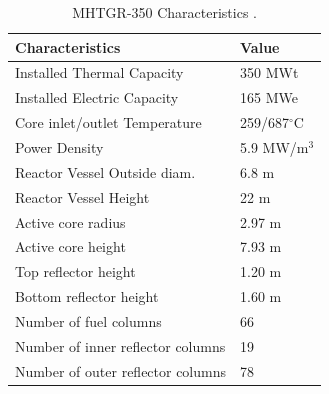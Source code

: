\begin{table}[htbp!]
  \centering
    \caption{MHTGR-350 Characteristics \cite{oecd_nea_benchmark_2017}.}
  \begin{tabular}{ll}
  \toprule
  Characteristics                   & Value               \\ \midrule
  Installed Thermal Capacity        & 350 MWt             \\
  Installed Electric Capacity       & 165 MWe             \\
  Core inlet/outlet Temperature     & 259/687$^{\circ}$C  \\
  Power Density                     & 5.9 MW/m$^3$        \\
  Reactor Vessel Outside diam.      & 6.8 m               \\
  Reactor Vessel Height             & 22 m                \\
  Active core radius                & 2.97 m              \\
  Active core height                & 7.93 m              \\
  Top reflector height              & 1.20 m              \\
  Bottom reflector height           & 1.60 m              \\
  Number of fuel columns            & 66                  \\
  Number of inner reflector columns & 19                  \\
  Number of outer reflector columns & 78                  \\
  \bottomrule
  \end{tabular}
  \label{tab:maincharac}
\end{table}

